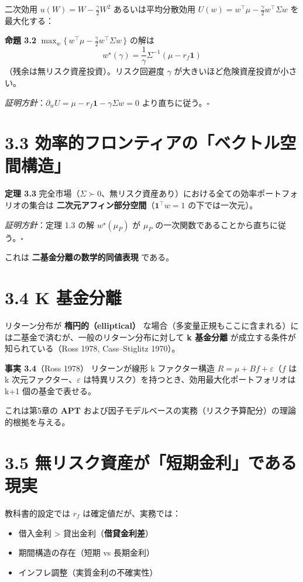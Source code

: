 \documentclass[11pt,a4paper]{report}
\begin{document}
二次効用 $u(W) = W - \tfrac{\gamma}{2} W^2$ あるいは平均分散効用 $U(w) = w^\top \mu - \tfrac{\gamma}{2} w^\top \Sigma w$ を最大化する：

\textbf{命題 3.2} $\max_w \{\,w^\top \mu - \tfrac{\gamma}{2} w^\top \Sigma w\,\}$ の解は \[ w^\star(\gamma) = \frac{1}{\gamma} \Sigma^{-1} (\mu - r_f \mathbf{1}) \] （残余は無リスク資産投資）。リスク回避度 $\gamma$ が大きいほど危険資産投資が小さい。

\emph{証明方針}：$\partial_w U = \mu - r_f\mathbf{1} - \gamma \Sigma w = 0$ より直ちに従う。$\square$

\section{3.3 効率的フロンティアの「ベクトル空間構造」}

\textbf{定理 3.3} 完全市場（$\Sigma \succ 0$、無リスク資産あり）における全ての効率ポートフォリオの集合は \textbf{二次元アフィン部分空間}（$\mathbf{1}^\top w = 1$ の下では一次元）。

\emph{証明方針}：定理 1.3 の解 $w^\star(\mu_P)$ が $\mu_P$ の一次関数であることから直ちに従う。$\square$

これは \textbf{二基金分離の数学的同値表現} である。

\section{3.4 K 基金分離}

リターン分布が \textbf{楕円的（elliptical）} な場合（多変量正規もここに含まれる）には二基金で済むが、一般のリターン分布に対して \textbf{k 基金分離} が成立する条件が知られている（Ross 1978, Cass–Stiglitz 1970）。

\textbf{事実 3.4}（Ross 1978） リターンが線形 k ファクター構造 $R = \mu + B f + \varepsilon$（$f$ は k 次元ファクター、$\varepsilon$ は特異リスク）を持つとき、効用最大化ポートフォリオは k+1 個の基金で表せる。

これは第5章の \textbf{APT} および因子モデルベースの実務（リスク予算配分）の理論的根拠を与える。

\section{3.5 無リスク資産が「短期金利」である現実}

教科書的設定では $r_f$ は確定値だが、実務では：

\begin{itemize}
\item 借入金利 > 貸出金利（\textbf{借貸金利差}）
\item 期間構造の存在（短期 vs 長期金利）
\item インフレ調整（実質金利の不確実性）
\end{itemize}
\end{document}
